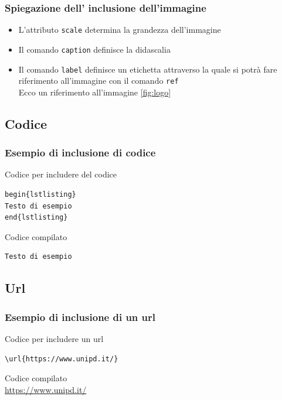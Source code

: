 \subsubsection{Spiegazione dell' inclusione dell'immagine}
\begin{itemize}
\item L'attributo \lstinline[columns=fixed]{scale} determina la grandezza dell'immagine
\item Il comando \lstinline[columns=fixed]{caption} definisce la didascalia
\item Il comando \lstinline[columns=fixed]{label} definisce un etichetta attraverso la quale si potrà fare riferimento all'immagine con il comando \lstinline[columns=fixed]{ref} \\
\qquad Ecco un riferimento all'immagine \ref{fig:logo}
\end{itemize}

\subsection{Codice}
\subsubsection{Esempio di inclusione di codice}
Codice per includere del codice
\begin{lstlisting}
begin{lstlisting}
Testo di esempio
end{lstlisting}
\end{lstlisting}
Codice compilato
\begin{lstlisting}
Testo di esempio
\end{lstlisting}

\subsection{Url}
\subsubsection{Esempio di inclusione di un url}
Codice per includere un url
\begin{lstlisting}
\url{https://www.unipd.it/}
\end{lstlisting}
Codice compilato\\
\url{https://www.unipd.it/}
